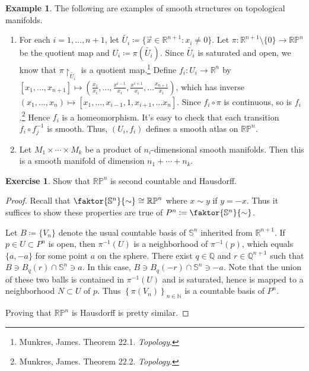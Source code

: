 \documentclass[10pt,letterpaper,cm]{nupset}
\theoremstyle{definition}
\newtheorem{exmp}[definition]{Example}
\theoremstyle{theorem}
\newtheorem{exercise}[definition]{Exercise}
\theoremstyle{remark}
\newcommand{\N}{\mathbb N}
\newcommand{\Q}{\mathbb Q}
\newcommand{\R}{\mathbb R}
\newcommand{\RP}{\mathbb{RP}}
\renewcommand{\S}{\mathbb S}
\newcommand{\1}{\mathbf{1}}
\newcommand{\x}{\vec x}
\newcommand{\0}{\vec 0}
\begin{document}
\begin{exmp}{The following are examples of smooth structures on topological manifolds.}
\begin{enumerate}
\item For each $i = 1, \ldots, n+1$, let $\tilde{U_i}\coloneqq  \{\x \in \R^{n+1} : x_i \ne 0\}$. Let $\pi: \R^{n+1} \setminus\{0\} \to \RP^n$ be the quotient map and $U_i \coloneqq  \pi\left(\tilde{U_i}\right)$. Since $\tilde{U_i}$ is saturated and open, we know that $\pi \restriction_{\tilde{U_i}}$ is a quotient map.\footnote{Munkres, James. Theorem 22.1. \textit{Topology}.} Define $f_i : U_i \to \R^n$ by $[x_1, \ldots, x_{n+1}] \mapsto \left(\frac{x_1}{x_i}, \ldots, \frac{x^{i-1}}{x_i}, \frac{x^{i+1}}{x_i}, \ldots \frac{x_{n+1}}{x_i}\right)$, which has inverse $(x_1, \ldots, x_n) \mapsto \left[x_1, \ldots, x_{i-1}, 1, x_{i+1}, \ldots x_n\right]$. Since $f_i \circ \pi$ is continuous, so is $f_i$.\footnote{Munkres, James. Theorem 22.2. \textit{Topology}.} Hence $f_i$ is a homeomorphism. It's easy to check that each transition $f_i \circ f_j^{-1}$ is smooth. Thus, $(U_i, f_i)$ defines a smooth atlas on $\RP^n$.
\item Let $M_1 \times \cdots \times M_k$ be a product of $n_i$-dimensional smooth manifolds. Then this is a smooth manifold of dimension $n_1 + \cdots + n_k$.
\end{enumerate}
\end{exmp}

\begin{exercise} 
Show that $\RP^n$ is second countable and Hausdorff. 
\end{exercise}
\begin{proof}
Recall that $\faktor{\S^n}{\sim} \cong \RP^n$ where $x \sim y$ if $y = -x$. Thus it suffices to show these properties are true of $P^n\coloneqq  \faktor{\S^n}{\sim}$. 

\medskip


Let $B\coloneqq \{V_n\}$ denote the usual countable basis of $\S^n$ inherited from $\R^{n+1}$. If $p\in U\subset P^n$ is open, then $\pi^{-1}(U)$ is a neighborhood of $\pi^{-1}(p)$, which equals $\{a, -a\}$ for some point $a$ on the sphere.  There exist $q\in \Q$ and $r \in \Q^{n+1}$ such that $B \ni B_q(r) \cap \S^n \ni a$. In this case, $B \ni B_q(-r) \cap \S^n \ni -a$. Note that the union of these two balls is contained in $\pi^{-1}(U)$ and is saturated, hence is mapped to a neighborhood $N \subset U$ of $p$. Thus $\left\{\pi(V_n)\right\}_{n\in \N}$  is a countable basis of $P^n$.

\medskip

 Proving that $\RP^n$ is Hausdorff is pretty similar.
\end{proof}
\end{document}
